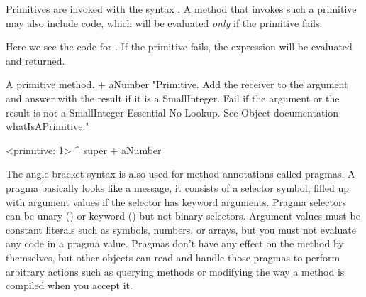\documentclass[a4paper,10pt,twoside]{book}
\begin{document}
Primitives are invoked with the syntax .
A method that invokes such a primitive may also include \st code, which will be evaluated \emph{only} if the primitive fails.

Here we see the code for .
If the primitive fails, the expression  will be evaluated and returned.

\begin{method}[primitive]{A primitive method.}
+ aNumber
  "Primitive. Add the receiver to the argument and answer with the result
  if it is a SmallInteger. Fail if the argument or the result is not a
  SmallInteger  Essential  No Lookup. See Object documentation whatIsAPrimitive."

  <primitive: 1>
  ^ super + aNumber
\end{method}





The angle bracket syntax is also used for method annotations called pragmas.
A pragma basically looks like a message, it consists of a selector symbol, filled up with argument values if the selector has keyword arguments.
Pragma selectors can be unary () or keyword () but not binary selectors.
Argument values must be constant literals such as symbols, numbers, or arrays, but you must not evaluate any code in a pragma value.
Pragmas don't have any effect on the method by themselves, but other objects can read and handle those pragmas to perform arbitrary actions such as querying methods or modifying the way a method is compiled when you accept it.
\end{document}
